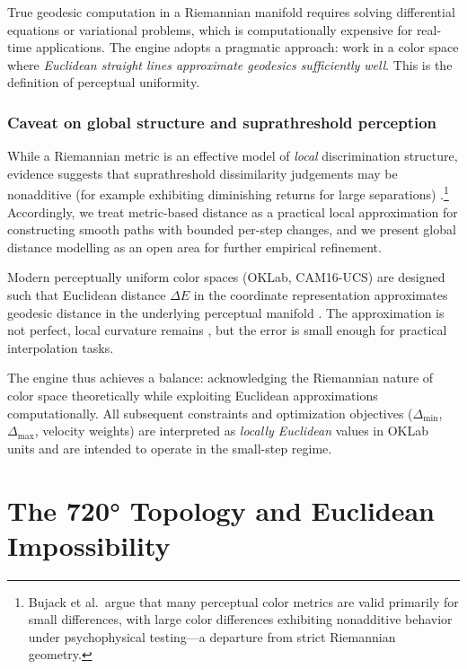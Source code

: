 True geodesic computation in a Riemannian manifold requires solving differential equations or variational problems, which is computationally expensive for real-time applications. The engine adopts a pragmatic approach: work in a color space where \emph{Euclidean straight lines approximate geodesics sufficiently well}. This is the definition of perceptual uniformity.

\subsubsection*{Caveat on global structure and suprathreshold perception}

While a Riemannian metric is an effective model of \emph{local} discrimination structure, evidence suggests that suprathreshold dissimilarity judgements may be nonadditive (for example exhibiting diminishing returns for large separations) \citep{bujack2022}.\footnote{Bujack et al.~argue that many perceptual color metrics are valid primarily for small differences, with large color differences exhibiting nonadditive behavior under psychophysical testing—a departure from strict Riemannian geometry.} Accordingly, we treat metric-based distance as a practical local approximation for constructing smooth paths with bounded per-step changes, and we present global distance modelling as an open area for further empirical refinement.

Modern perceptually uniform color spaces (OKLab, CAM16-UCS) are designed such that Euclidean distance $\Delta E$ in the coordinate representation approximates geodesic distance in the underlying perceptual manifold \citep{ottosson2020,safdar2017}. The approximation is not perfect, local curvature remains \citep{hong2025}, but the error is small enough for practical interpolation tasks.

The engine thus achieves a balance: acknowledging the Riemannian nature of color space theoretically while exploiting Euclidean approximations computationally. All subsequent constraints and optimization objectives ($\Delta_{\min}$, $\Delta_{\max}$, velocity weights) are interpreted as \emph{locally Euclidean} values in OKLab units and are intended to operate in the small-step regime.

\section{The 720° Topology and Euclidean Impossibility}
\label{sec:topology-impossibility}

